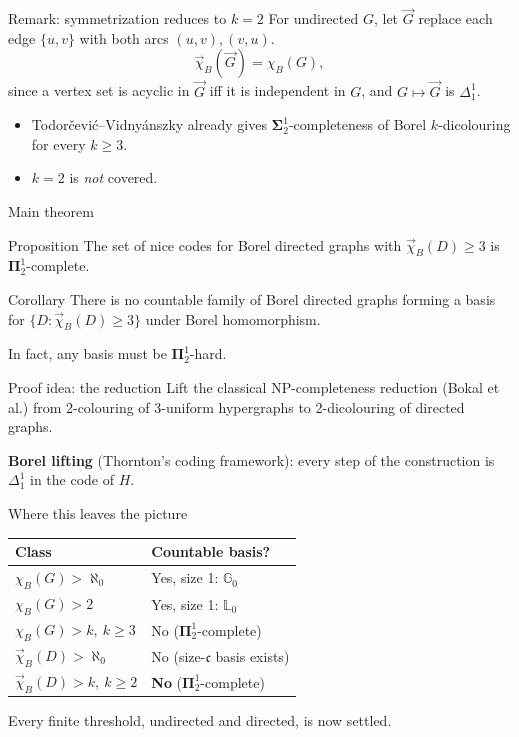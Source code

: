 \documentclass[aspectratio=169]{beamer}
\begin{document}
\begin{frame}{Remark: symmetrization reduces to $k=2$}
  For undirected $G$, let $\vec G$ replace each edge $\{u,v\}$ with both arcs $(u,v),(v,u)$.
  $$\vec\chi_B(\vec G) = \chi_B(G),$$
  since a vertex set is acyclic in $\vec G$ iff it is independent in $G$, and $G\mapsto\vec G$ is $\Delta^1_1$.
  \begin{itemize}
    \item Todor\v{c}evi\'c--Vidny\'anszky already gives $\mathbf\Sigma^1_2$-completeness of Borel $k$-dicolouring for every $k\geq 3$.
    \item $k=2$ is \emph{not} covered.
  \end{itemize}
\end{frame}

\begin{frame}{Main theorem}
  \begin{block}{Proposition}
    The set of nice codes for Borel directed graphs with $\vec\chi_B(D)\geq 3$ is $\mathbf\Pi^1_2$-complete.
  \end{block}
  \begin{block}{Corollary}
    There is no countable family of Borel directed graphs forming a basis for $\{D : \vec\chi_B(D)\geq 3\}$ under Borel homomorphism.
  \end{block}
  \vspace{0.3em}
  In fact, any basis must be $\mathbf\Pi^1_2$-hard.
\end{frame}

\begin{frame}{Proof idea: the reduction}
  Lift the classical NP-completeness reduction (Bokal et al.) from 2-colouring of 3-uniform hypergraphs to 2-dicolouring of directed graphs.

  \textbf{Borel lifting} (Thornton's coding framework): every step of the construction is $\Delta^1_1$ in the code of $H$.
\end{frame}

\begin{frame}{Where this leaves the picture}
  \begin{center}
  \small
  \begin{tabular}{ll}
    \toprule
    \textbf{Class} & \textbf{Countable basis?}\\
    \midrule
    $\chi_B(G) > \aleph_0$ & Yes, size 1: $\mathbb G_0$\\
    $\chi_B(G) > 2$ & Yes, size 1: $\mathbb L_0$\\
    $\chi_B(G) > k,\ k\geq 3$ & No ($\mathbf\Pi^1_2$-complete)\\
    \midrule
    $\vec\chi_B(D) > \aleph_0$ & No (size-$\mathfrak c$ basis exists)\\
    $\vec\chi_B(D) > k,\ k\geq 2$ & \textbf{No} ($\mathbf\Pi^1_2$-complete)\\
    \bottomrule
  \end{tabular}
  \end{center}
  \vspace{0.5em}
  Every finite threshold, undirected and directed, is now settled.
\end{frame}
\end{document}
